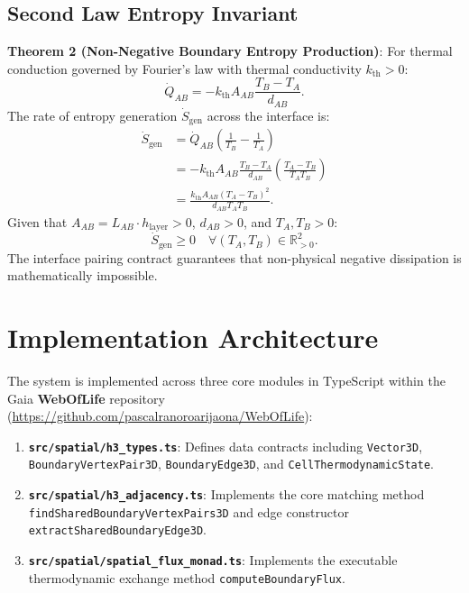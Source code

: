 \documentclass[10pt,journal,compsoc]{IEEEtran}
\begin{document}
\subsection{Second Law Entropy Invariant}
\textbf{Theorem 2 (Non-Negative Boundary Entropy Production)}: For thermal conduction governed by Fourier's law with thermal conductivity $k_{\text{th}} > 0$:
\begin{equation}
\dot{Q}_{AB} = -k_{\text{th}} A_{AB} \frac{T_B - T_A}{d_{AB}}.
\end{equation}
The rate of entropy generation $\dot{S}_{\text{gen}}$ across the interface is:
\begin{align}
\dot{S}_{\text{gen}} &= \dot{Q}_{AB} \left( \frac{1}{T_B} - \frac{1}{T_A} \right) \nonumber \\
&= -k_{\text{th}} A_{AB} \frac{T_B - T_A}{d_{AB}} \left( \frac{T_A - T_B}{T_A T_B} \right) \nonumber \\
&= \frac{k_{\text{th}} A_{AB} (T_A - T_B)^2}{d_{AB} T_A T_B}.
\end{align}
Given that $A_{AB} = L_{AB} \cdot h_{\text{layer}} > 0$, $d_{AB} > 0$, and $T_A, T_B > 0$:
\begin{equation}
\dot{S}_{\text{gen}} \ge 0 \quad \forall (T_A, T_B) \in \mathbb{R}_{>0}^2.
\end{equation}
The interface pairing contract guarantees that non-physical negative dissipation is mathematically impossible.

\section{Implementation Architecture}

The system is implemented across three core modules in TypeScript within the Gaia \textbf{WebOfLife} repository (\url{https://github.com/pascalranoroarijaona/WebOfLife}):

\begin{enumerate}
    \item \textbf{\texttt{src/spatial/h3\_types.ts}}: Defines data contracts including \texttt{Vector3D}, \texttt{BoundaryVertexPair3D}, \texttt{BoundaryEdge3D}, and \texttt{CellThermodynamicState}.
    \item \textbf{\texttt{src/spatial/h3\_adjacency.ts}}: Implements the core matching method \texttt{findSharedBoundaryVertexPairs3D} and edge constructor \texttt{extractSharedBoundaryEdge3D}.
    \item \textbf{\texttt{src/spatial/spatial\_flux\_monad.ts}}: Implements the executable thermodynamic exchange method \texttt{computeBoundaryFlux}.
\end{enumerate}
\end{document}
